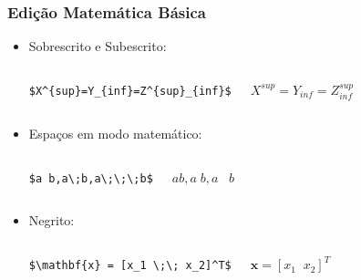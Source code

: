 \begin{frame}[fragile]
\frametitle{Edição Matemática Básica}

\begin{itemize}
  \item Sobrescrito e Subescrito:
      
\begin{columns}
\small
\verb|$X^{sup}=Y_{inf}=Z^{sup}_{inf}$|
	\begin{framed}
	$X^{sup}=Y_{inf}=Z^{sup}_{inf}$
	\end{framed}
\end{columns}

\item Espaços em modo matemático:
\begin{columns} \small
	\verb|$a b,a\;b,a\;\;\;b$| 
	\begin{framed}
	$a b,a\;b,a\;\;\;b$ 
	\end{framed}
\end{columns}

\item Negrito:
\begin{columns}\small
\verb|$\mathbf{x} = [x_1 \;\; x_2]^T$|
	\begin{framed}
	$\mathbf{x} = [x_1 \;\; x_2]^T$
	\end{framed}
\end{columns}
\end{itemize}
\end{frame}


